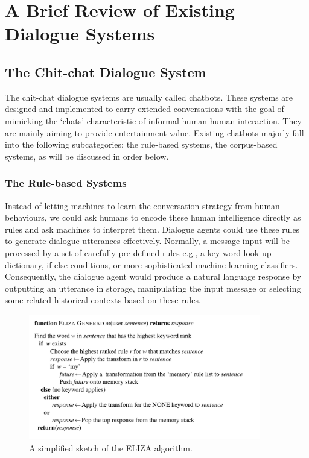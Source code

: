 \documentclass[bsc,frontabs,twoside,singlespacing,parskip,deptreport]{infthesis}     %
\begin{document}
\section {A Brief Review of Existing Dialogue Systems}

\subsection{The Chit-chat Dialogue System}

The chit-chat dialogue systems are usually called chatbots. These systems are designed and implemented to carry extended conversations with the goal of mimicking the ‘chats’ characteristic of informal human-human interaction. They are mainly aiming to provide entertainment value. Existing chatbots majorly fall into the following subcategories: the rule-based systems, the corpus-based systems, as will be discussed in order below.

\subsubsection*{The Rule-based Systems}

Instead of letting machines to learn the conversation strategy from human behaviours, we could ask humans to encode these human intelligence directly as rules and ask machines to interpret them. Dialogue agents could use these rules to generate dialogue utterances effectively. Normally, a message input will be processed by a set of carefully pre-defined rules e.g., a key-word look-up dictionary, if-else conditions, or more sophisticated machine learning classifiers\cite{jiweilithesis}. Consequently, the dialogue agent would produce a natural language response by outputting an utterance in storage, manipulating the input message or selecting some related historical contexts based on these rules.

\begin{figure}[h]
    \centering
    \includegraphics[width=0.9\textwidth]{elizarule.jpeg}
    \caption{A simplified sketch of the ELIZA algorithm.}
    \label{fig:elizarule}
\end{figure}
\end{document}
